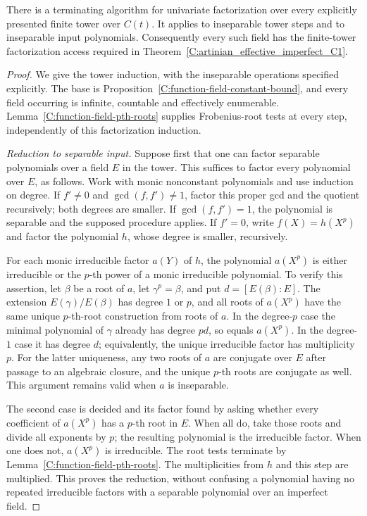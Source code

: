 \begin{theorem}
\label{C:function-field-factorization}
There is a terminating algorithm for univariate factorization
over every explicitly presented finite tower over $C(t)$.
It applies to inseparable tower steps and to inseparable
input polynomials. Consequently every such field has the
finite-tower factorization access required in
Theorem~\ref{C:artinian_effective_imperfect_C1}.
\end{theorem}
\begin{proof}
We give the tower induction, with the inseparable operations
specified explicitly. The base is
Proposition~\ref{C:function-field-constant-bound}, and every
field occurring is infinite, countable and effectively
enumerable. Lemma~\ref{C:function-field-pth-roots} supplies
Frobenius-root tests at every step, independently of this
factorization induction.

\emph{Reduction to separable input.}
Suppose first that one can factor separable polynomials over a
field $E$ in the tower. This suffices to factor every polynomial
over $E$, as follows. Work with monic nonconstant polynomials
and use induction on degree.
If $f'\ne0$ and $\gcd(f,f')\ne1$, factor this proper gcd and
the quotient recursively; both degrees are smaller.
If $\gcd(f,f')=1$, the polynomial is separable and the supposed
procedure applies.
If $f'=0$, write $f(X)=h(X^p)$ and factor the polynomial $h$,
whose degree is smaller, recursively.

For each monic irreducible factor $a(Y)$ of $h$, the polynomial
$a(X^p)$ is either irreducible or the $p$-th power of a monic
irreducible polynomial. To verify this assertion, let $\beta$
be a root of $a$, let $\gamma^p=\beta$, and put
$d=[E(\beta):E]$. The extension
$E(\gamma)/E(\beta)$ has degree $1$ or $p$, and all roots of
$a(X^p)$ have the same unique $p$-th-root construction from
roots of $a$. In the degree-$p$ case the minimal polynomial
of $\gamma$ already has degree $pd$, so equals $a(X^p)$.
In the degree-$1$ case it has degree $d$; equivalently, the
unique irreducible factor has multiplicity $p$.
For the latter uniqueness, any two roots of $a$ are conjugate
over $E$ after passage to an algebraic closure, and the
unique $p$-th roots are conjugate as well.
This argument remains valid when $a$ is inseparable.

The second case is decided and its factor found by asking
whether every coefficient of $a(X^p)$ has a $p$-th root in $E$.
When all do, take those roots and divide all exponents by $p$;
the resulting polynomial is the irreducible factor.
When one does not, $a(X^p)$ is irreducible.
The root tests terminate by
Lemma~\ref{C:function-field-pth-roots}.
The multiplicities from $h$ and this step are multiplied.
This proves the reduction, without confusing a polynomial
having no repeated irreducible factors with a separable
polynomial over an imperfect field.


\end{proof}

